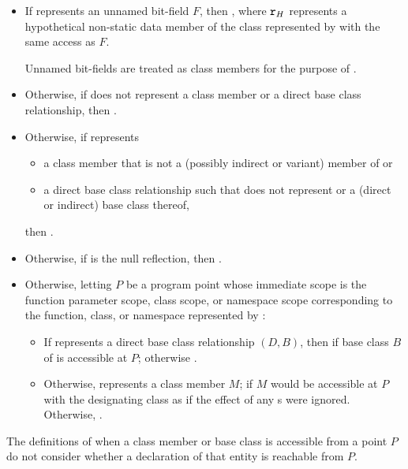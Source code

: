 \begin{itemdescr}
\pnum
\returns
\begin{itemize}
\item
  If  represents an unnamed bit-field $F$,
  then ,
  where $\tcode{r}_H$ represents a hypothetical non-static data member
  of the class represented by 
  with the same access as $F$.
  \begin{note}
  Unnamed bit-fields are treated as class members
  for the purpose of .
  \end{note}
\item
  Otherwise, if  does not represent a class member
  or a direct base class relationship,
  then .
\item
  Otherwise, if  represents
  \begin{itemize}
  \item
    a class member that is not a (possibly indirect or variant)
    member of  or
  \item
    a direct base class relationship such that 
    does not represent 
    or a (direct or indirect) base class thereof,
  \end{itemize}
  then .
\item
  Otherwise, if  is the null reflection,
  then .
\item
  Otherwise, letting $P$ be a program point whose immediate scope is the
  function parameter scope, class scope, or namespace scope
  corresponding to the
  function, class, or namespace
  represented by :
  \begin{itemize}
  \item
    If  represents a direct base class relationship $(D, B)$,
    then  if base class $B$ of 
    is accessible at $P$;
    otherwise .
  \item
    Otherwise,  represents a class member $M$;
     if $M$ would be accessible at $P$
    with the designating class as 
    if the effect of any s were ignored.
    Otherwise, .
  \end{itemize}
\end{itemize}
\begin{note}
The definitions of when a class member or base class is accessible from a point $P$
do not consider whether a declaration of that entity is reachable from $P$.
\end{note}


\end{itemdescr}
